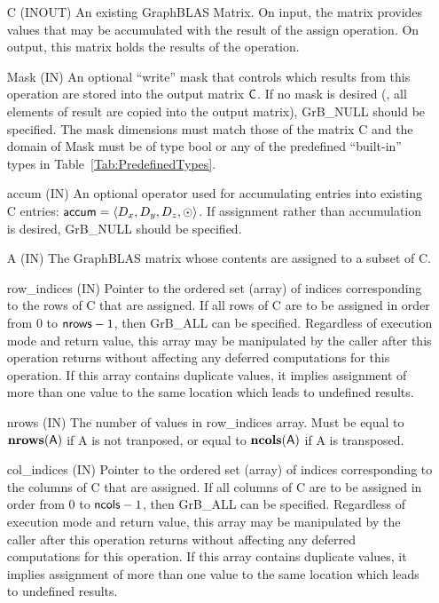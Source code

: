 \begin{itemize}[leftmargin=1in]
    \item[{\sf C}]    ({\sf INOUT}) An existing GraphBLAS Matrix.  On input,
    the matrix provides values that may be accumulated with the result of the
    assign operation.  On output, this matrix holds the results of the
    operation.

    \item[{\sf Mask}]  ({\sf IN}) An optional ``write'' mask that controls which
    results from this operation are stored into the output matrix
    ${\sf C}$.  If no mask is desired (\ie, all elements
    of result are copied into the output matrix), {\sf GrB\_NULL}
    should be specified. The mask dimensions must match those of the
    matrix {\sf C} and the domain of {\sf Mask} must be
    of type {\sf bool} or any of the predefined ``built-in'' types in
    Table~\ref{Tab:PredefinedTypes}.

    \item[{\sf accum}]    ({\sf IN}) An optional operator used for accumulating
    entries into existing {\sf C} entries: ${\sf accum} = \langle D_x,
    D_y, D_z,\odot \rangle$. If assignment rather than accumulation is
    desired, {\sf GrB\_NULL} should be specified.

    \item[{\sf A}]       ({\sf IN}) The GraphBLAS matrix whose contents are 
    assigned to a subset of {\sf C}.
    
    \item[{\sf row\_indices}]  ({\sf IN}) Pointer to the ordered set (array) of 
    indices corresponding to the rows of {\sf C} that are assigned.  If all rows
    of {\sf C} are to be assigned in order from $0$ to ${\sf nrows} - 1$, then 
    {\sf GrB\_ALL} can be specified.  Regardless of execution mode and return 
    value, this array may be manipulated by the caller after this operation 
    returns without affecting any deferred computations for this operation.
    If this array contains duplicate values, it implies assignment of more 
    than one value to the same location which leads to undefined results.

    \item[{\sf nrows}] ({\sf IN}) The number of values in {\sf row\_indices} 
	array. Must be equal to $\bold{nrows}({\sf A})$ if {\sf A} is not tranposed,
	or equal to $\bold{ncols}({\sf A})$ if {\sf A} is transposed.

    \item[{\sf col\_indices}]  ({\sf IN}) Pointer to the ordered set (array) of 
    indices corresponding to the columns of {\sf C} that are assigned.  If all 
    columns of {\sf C} are to be assigned in order from $0$ to ${\sf ncols} - 1$, 
    then {\sf GrB\_ALL} can be specified.  Regardless of execution mode and return 
    value, this array may be manipulated by the caller after this operation 
    returns without affecting any deferred computations for this operation.
    If this array contains duplicate values, it implies assignment of more 
    than one value to the same location which leads to undefined results.
    

\end{itemize}
